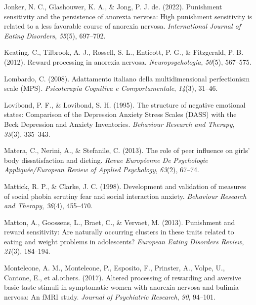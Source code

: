 \documentclass[
  man,floatsintext]{apa6}
\newlength{\cslhangindent}
\newlength{\cslentryspacingunit} %
\newenvironment{CSLReferences}[2] %
 {%
  \setlength{\parindent}{0pt}
  \ifodd #1
  \let\oldpar\par
  \def\par{\hangindent=\cslhangindent\oldpar}
  \fi
  \setlength{\parskip}{#2\cslentryspacingunit}
 }%
 {}
\begin{document}
\begin{CSLReferences}{1}{0}
\leavevmode{}%
Jonker, N. C., Glashouwer, K. A., \& Jong, P. J. de. (2022). Punishment sensitivity and the persistence of anorexia nervosa: High punishment sensitivity is related to a less favorable course of anorexia nervosa. \emph{International Journal of Eating Disorders}, \emph{55}(5), 697--702.

\leavevmode{}%
Keating, C., Tilbrook, A. J., Rossell, S. L., Enticott, P. G., \& Fitzgerald, P. B. (2012). Reward processing in anorexia nervosa. \emph{Neuropsychologia}, \emph{50}(5), 567--575.

\leavevmode{}%
Lombardo, C. (2008). Adattamento italiano della multidimensional perfectionism scale (MPS). \emph{Psicoterapia Cognitiva e Comportamentale}, \emph{14}(3), 31--46.

\leavevmode{}%
Lovibond, P. F., \& Lovibond, S. H. (1995). {The structure of negative emotional states: Comparison of the Depression Anxiety Stress Scales (DASS) with the Beck Depression and Anxiety Inventories}. \emph{Behaviour Research and Therapy}, \emph{33}(3), 335--343.

\leavevmode{}%
Matera, C., Nerini, A., \& Stefanile, C. (2013). The role of peer influence on girls' body dissatisfaction and dieting. \emph{Revue Europ{é}enne De Psychologie Appliqu{é}e/European Review of Applied Psychology}, \emph{63}(2), 67--74.

\leavevmode{}%
Mattick, R. P., \& Clarke, J. C. (1998). Development and validation of measures of social phobia scrutiny fear and social interaction anxiety. \emph{Behaviour Research and Therapy}, \emph{36}(4), 455--470.

\leavevmode{}%
Matton, A., Goossens, L., Braet, C., \& Vervaet, M. (2013). Punishment and reward sensitivity: Are naturally occurring clusters in these traits related to eating and weight problems in adolescents? \emph{European Eating Disorders Review}, \emph{21}(3), 184--194.

\leavevmode{}%
Monteleone, A. M., Monteleone, P., Esposito, F., Prinster, A., Volpe, U., Cantone, E., et al.others. (2017). Altered processing of rewarding and aversive basic taste stimuli in symptomatic women with anorexia nervosa and bulimia nervosa: An fMRI study. \emph{Journal of Psychiatric Research}, \emph{90}, 94--101.


\end{CSLReferences}
\end{document}
